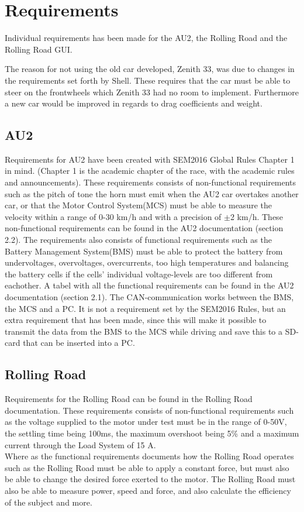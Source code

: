 \chapter{Requirements}
Individual requirements has been made for the AU2, the Rolling Road and the Rolling Road GUI.

The reason for not using the old car developed, Zenith 33, was due to changes in the requirements set forth by Shell. These requires that the car must be able to steer on the frontwheels which Zenith 33 had no room to implement. Furthermore a new car would be improved in regards to drag coefficients and weight.

\section{AU2}
Requirements for AU2 have been created with SEM2016 Global Rules Chapter 1 in mind\cite{ShellRequirements}. (Chapter 1 is the academic chapter of the race, with the academic rules and announcements). These requirements consists of non-functional requirements such as the pitch of tone the horn must emit when the AU2 car overtakes another car, or that the Motor Control System(MCS) must be able to measure the velocity within a range of 0-30 km/h and with a precision of $\pm$2 km/h. These non-functional requirements can be found in the AU2 documentation\cite{AU2} (section 2.2). The requirements also consists of functional requirements such as the Battery Management System(BMS) must be able to protect the battery from undervoltages, overvoltages, overcurrents, too high temperatures and balancing the battery cells if the cells' individual voltage-levels are too different from eachother. A tabel with all the functional requirements can be found in the AU2 documentation\cite{AU2} (section 2.1). The CAN-communication works between the BMS, the MCS and a PC. It is not a requirement set by the SEM2016 Rules, but an extra requirement that has been made, since this will make it possible to transmit the data from the BMS to the MCS while driving and save this to a SD-card that can be inserted into a PC.

\section{Rolling Road}
Requirements for the Rolling Road can be found in the Rolling Road documentation\cite{RR}.
These requirements consists of non-functional requirements such as the voltage supplied to the motor under test must be in the range of 0-50V, the settling time being 100ms, the maximum overshoot being 5\% and a maximum current through the Load System of 15 A.\\
Where as the functional requirements documents how the Rolling Road operates such as the Rolling Road must be able to apply a constant force, but must also be able to change the desired force exerted to the motor. The Rolling Road must also be able to measure power, speed and force, and also calculate the efficiency of the subject and more.


